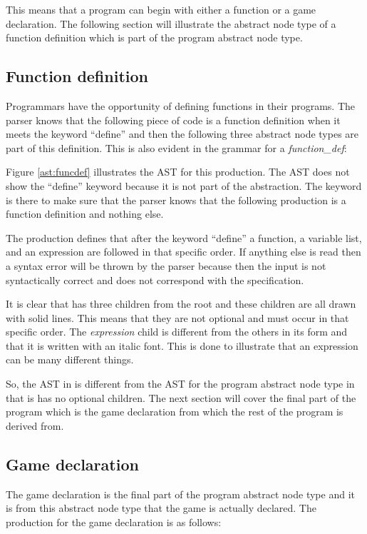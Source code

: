 This means that a program can begin with either a function or a game declaration. The following section will illustrate the abstract node type of a function definition which is part of the program abstract node type.%

\subsection{Function definition}%
Programmars have the opportunity of defining functions in their programs. The parser knows that the following piece of code is a function definition when it meets the keyword ``define'' and then the following three abstract node types are part of this definition. This is also evident in the grammar for a \textit{function\_def}:%

\begin{ebnf}%
%
\end{ebnf}%

%

Figure \ref{ast:funcdef} illustrates the AST for this production. The AST does not show the ``define'' keyword because it is not part of the abstraction. The keyword is there to make sure that the parser knows that the following production is a function definition and nothing else.%

The production defines that after the keyword ``define'' a function, a variable list, and an expression are followed in that specific order. If anything else is read then a syntax error will be thrown by the parser because then the input is not syntactically correct and does not correspond with the specification.%

It is clear that  has three children from the root and these children are all drawn with solid lines. This means that they are not optional and must occur in that specific order. The \textit{expression} child is different from the others in its form and that it is written with an italic font. This is done to illustrate that an expression can be many different things.%

So, the AST in  is different from the AST for the program abstract node type in that is has no optional children. The next section will cover the final part of the program which is the game declaration from which the rest of the program is derived from.%

\subsection{Game declaration}%
The game declaration is the final part of the program abstract node type and it is from this abstract node type that the game is actually declared. The production for the game declaration is as follows:%


